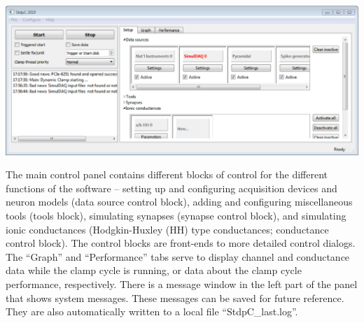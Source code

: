 \documentclass{article}
\begin{document}
\parbox{\textwidth}{
  \includegraphics[width=\textwidth]{main}
}
\vspace*{0.5cm}

The main control panel contains different blocks of control for the
different functions of the software -- setting up and configuring acquisition
devices and neuron models (data source control block), adding and configuring
miscellaneous tools (tools block), simulating synapses
(synapse control block), and simulating ionic conductances (Hodgkin-Huxley (HH)
type conductances; conductance control block). The control blocks are front-ends to
more detailed control dialogs. The ``Graph'' and ``Performance'' tabs serve
to display channel and conductance data while the clamp cycle is running, or data
about the clamp cycle performance, respectively. There is a message window in the
left part of the panel that shows system messages. These messages can
be saved for future reference. They are also automatically written to
a local file ``StdpC\_last.log''.
\end{document}
